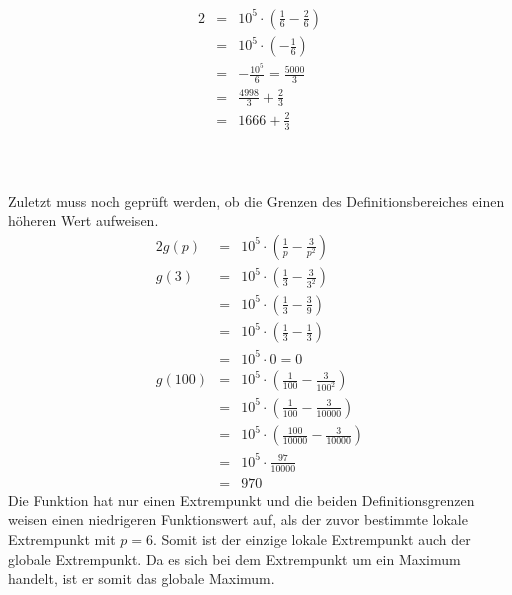 \documentclass[10pt,a4paper,oneside,ngerman,numbers=noenddot]{scrartcl}
\begin{document}
\begin{enumerate}
\begin{alignat*}{2}
		&=& 10^{5} \cdot \left( \frac{1}{6} - \frac{2}{6} \right) \\
		&=& 10^{5} \cdot \left(- \frac{1}{6} \right) \\
		&=& -\frac{10^{5}}{6} = \frac{5000}{3} \\
		&=& \frac{4998}{3} + \frac{2}{3} \\
		&=& 1666 + \frac{2}{3}
	\end{alignat*} \\\\\\
	Zuletzt muss noch geprüft werden, ob die Grenzen des Definitionsbereiches einen höheren Wert aufweisen.
	\begin{alignat*}{2}
		g(p) &=& 10^{5} \cdot \left(\frac{1}{p} - \frac{3}{p^{2}} \right) \\
		g(3) &=& 10^{5} \cdot \left(\frac{1}{3} - \frac{3}{3^{2}} \right) \\
		&=& 10^{5} \cdot \left(\frac{1}{3} - \frac{3}{9} \right) \\
		&=& 10^{5} \cdot \left(\frac{1}{3} - \frac{1}{3} \right) \\
		&=& 10^{5} \cdot 0 = 0 \\
		g(100) &=& 10^{5} \cdot \left(\frac{1}{100} - \frac{3}{100^{2}} \right) \\
		&=& 10^{5} \cdot \left(\frac{1}{100} - \frac{3}{10000} \right) \\
		&=& 10^{5} \cdot \left(\frac{100}{10000} - \frac{3}{10000} \right) \\
		&=& 10^{5} \cdot \frac{97}{10000} \\
		&=& 970
	\end{alignat*}
	Die Funktion hat nur einen Extrempunkt und die beiden Definitionsgrenzen weisen einen niedrigeren Funktionswert auf, als der zuvor bestimmte lokale Extrempunkt mit $p = 6$. Somit ist der einzige lokale Extrempunkt auch der globale Extrempunkt. Da es sich bei dem Extrempunkt um ein Maximum handelt, ist er somit das globale Maximum.
\end{enumerate}
\subsection{} %
\end{document}
